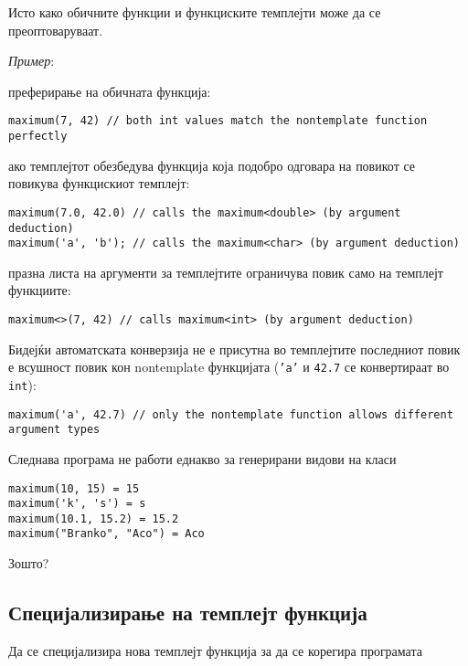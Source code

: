 Исто како обичните функции и функциските темплејти може да се преоптоваруваат.

\textsl{Пример}:



преферирање на обичната функција:
\begin{lstlisting}
maximum(7, 42) // both int values match the nontemplate function perfectly
\end{lstlisting}

ако темплејтот обезбедува функција која подобро одговара на повикот се повикува
функцискиот темплејт:

\begin{lstlisting}
maximum(7.0, 42.0) // calls the maximum<double> (by argument deduction)
maximum('a', 'b'); // calls the maximum<char> (by argument deduction)
\end{lstlisting}

празна листа на аргументи за темплејтите ограничува повик само на темплејт
функциите:

\begin{lstlisting}
maximum<>(7, 42) // calls maximum<int> (by argument deduction)
\end{lstlisting}

Бидејќи автоматската конверзија не е присутна во темплејтите последниот повик е
всушност повик кон nontemplate функцијата (\texttt{'a'} и \texttt{42.7} се
конвертираат во \texttt{int}):

\begin{lstlisting}
maximum('a', 42.7) // only the nontemplate function allows different argument types
\end{lstlisting}

Следнава програма не работи еднакво за генерирани видови на класи



\begin{verbatim}
maximum(10, 15) = 15
maximum('k', 's') = s
maximum(10.1, 15.2) = 15.2
maximum("Branko", "Aco") = Aco
\end{verbatim}

Зошто?

\subsection{Специјализирање на темплејт функција} 

Да се специјализира нова темплејт функција за да се корегира програмата

